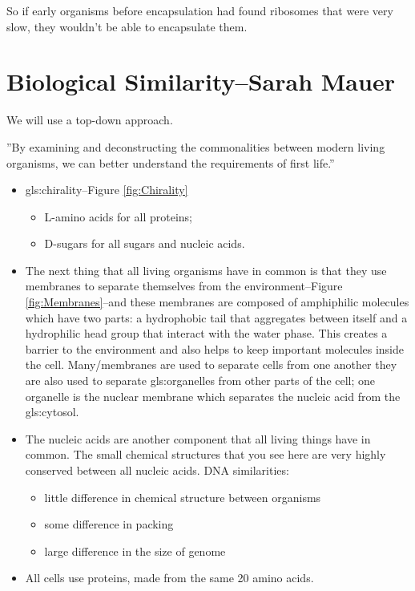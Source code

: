 \documentclass[]{article}
\begin{document}
So if early organisms before encapsulation had found ribosomes that were very slow, they wouldn't be able to encapsulate them. 
\section[Biological Similarity]{Biological Similarity--Sarah Mauer}

We will use a top-down approach.

 ''By examining and deconstructing the commonalities between modern living organisms, we can better understand the requirements of first life.''

\begin{itemize}
	\item \Gls{gls:chirality}--Figure \ref{fig:Chirality}
	\begin{itemize}
		\item L-amino acids for all proteins;
		\item D-sugars for all sugars and nucleic acids.
	\end{itemize}
	\item The next thing that all living organisms have in common
	is that they use membranes to separate themselves from the environment--Figure \ref{fig:Membranes}--and these membranes are composed of amphiphilic molecules which have two parts:  a hydrophobic tail that aggregates between itself and a hydrophilic head group that interact with the water phase. This creates a barrier to the environment and also helps to keep important molecules inside the cell.
	Many/membranes are used to separate cells from one another they are also used
	to separate \glspl{gls:organelle} from other parts of the cell;
	one organelle is the nuclear membrane which separates the nucleic acid from the \gls{gls:cytosol}.
	\item The nucleic acids are another component that all living things have in common. The small chemical structures that you see here are very highly conserved between all nucleic acids. DNA similarities:\begin{itemize}
		\item little difference in chemical structure between organisms
		\item some difference in packing
		\item large difference in the size of genome
	\end{itemize}
	\item All cells use proteins, made from the same 20 amino acids.
\end{itemize}
\end{document}
